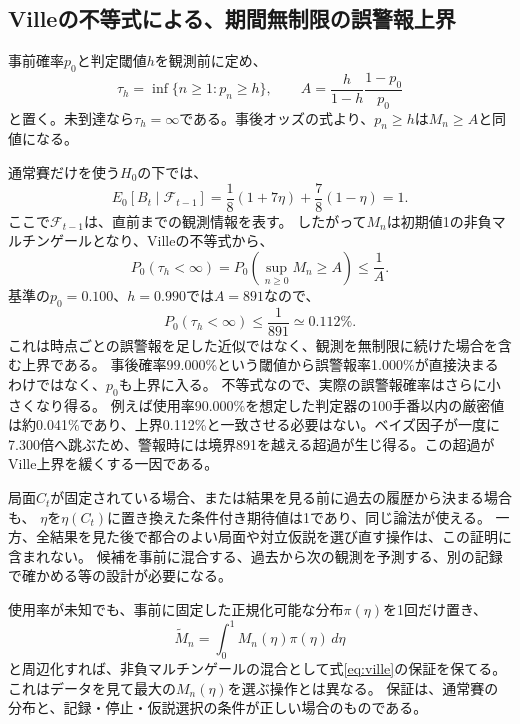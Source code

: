 \documentclass[11pt,a4paper]{article}
\numberwithin{equation}{section}
\begin{document}
\subsection{Villeの不等式による、期間無制限の誤警報上界}
事前確率$p_0$と判定閾値$h$を観測前に定め、
\begin{equation}
\tau_h=\inf\{n\ge1:p_n\ge h\},\qquad
A=\frac{h}{1-h}\frac{1-p_0}{p_0}
\end{equation}
と置く。未到達なら$\tau_h=\infty$である。事後オッズの式より、$p_n\ge h$は$M_n\ge A$と同値になる。

通常賽だけを使う$H_0$の下では、
\begin{equation}
E_0[B_t\mid\mathcal F_{t-1}]
=\frac18(1+7\eta)+\frac78(1-\eta)=1.
\end{equation}
ここで$\mathcal F_{t-1}$は、直前までの観測情報を表す。
したがって$M_n$は初期値1の非負マルチンゲールとなり、Villeの不等式から\cite{howard2021}、
\begin{equation}
\boxed{P_0(\tau_h<\infty)=P_0\!\left(\sup_{n\ge0}M_n\ge A\right)\le\frac1A.}
\label{eq:ville}
\end{equation}
基準の$p_0=0.100$、$h=0.990$では$A=891$なので、
\begin{equation}
P_0(\tau_h<\infty)\le\frac1{891}\simeq0.112\%.
\end{equation}
これは時点ごとの誤警報を足した近似ではなく、観測を無制限に続けた場合を含む上界である。
事後確率99.000\%という閾値から誤警報率1.000\%が直接決まるわけではなく、$p_0$も上界に入る。
不等式なので、実際の誤警報確率はさらに小さくなり得る。
例えば使用率90.000\%を想定した判定器の100手番以内の厳密値は約0.041\%であり、上界0.112\%と一致させる必要はない。ベイズ因子が一度に7.300倍へ跳ぶため、警報時には境界891を越える超過が生じ得る。この超過がVille上界を緩くする一因である。

局面$C_t$が固定されている場合、または結果を見る前に過去の履歴から決まる場合も、
$\eta$を$\eta(C_t)$に置き換えた条件付き期待値は1であり、同じ論法が使える。
一方、全結果を見た後で都合のよい局面や対立仮説を選び直す操作は、この証明に含まれない。
候補を事前に混合する、過去から次の観測を予測する、別の記録で確かめる等の設計が必要になる。

使用率が未知でも、事前に固定した正規化可能な分布$\pi(\eta)$を1回だけ置き、
\begin{equation}
\widetilde M_n=\int_0^1M_n(\eta)\pi(\eta)\,d\eta
\label{eq:mixture-BF}
\end{equation}
と周辺化すれば、非負マルチンゲールの混合として式\eqref{eq:ville}の保証を保てる\cite{howard2021}。
これはデータを見て最大の$M_n(\eta)$を選ぶ操作とは異なる。
保証は、通常賽の分布と、記録・停止・仮説選択の条件が正しい場合のものである。
\end{document}
